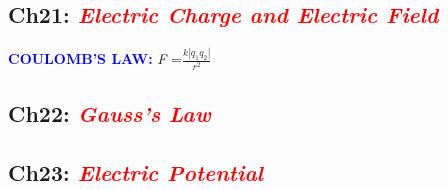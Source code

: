 \documentclass{article}
\def\TOPIC#1{\textcolor{red}{\textit{\textbf{#1}}}}
\begin{document}
\begin{center}
  \section*{Ch21: \TOPIC{Electric Charge and Electric Field}}
\end{center}
\textcolor{blue}{\textbf{COULOMB'S LAW:}} \textit{F} =\LARGE \(\frac{k|q_1 q_2|}{r^2}\)

\newpage
\begin{center}
  \section*{Ch22: \TOPIC{Gauss's Law}}
\end{center}

\newpage
\begin{center}
  \section*{Ch23: \TOPIC{Electric Potential}}
\end{center}
\end{document}
